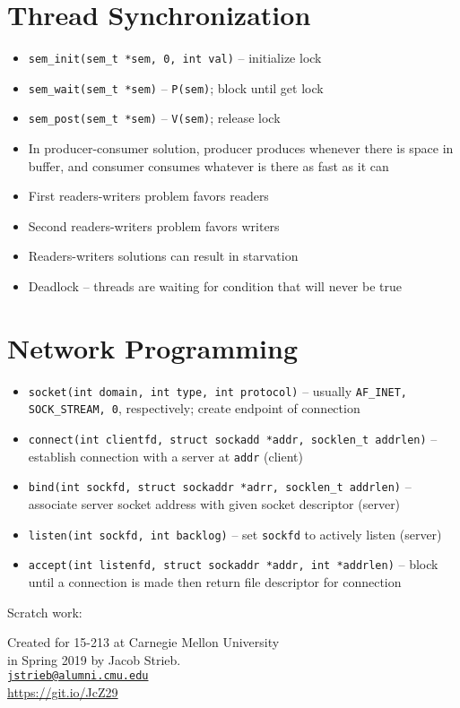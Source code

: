 \documentclass[twocolumn]{article}
\begin{document}
\section{Thread Synchronization}
\begin{itemize}[noitemsep]
    \item \texttt{sem\_init(sem\_t *sem, 0, int val)} -- initialize lock
    \item \texttt{sem\_wait(sem\_t *sem)} -- \texttt{P(sem)}; block until get lock
    \item \texttt{sem\_post(sem\_t *sem)} -- \texttt{V(sem)}; release lock
    \item In producer-consumer solution, producer produces whenever there is space in buffer, and consumer consumes whatever is there as fast as it can
    \item First readers-writers problem favors readers
    \item Second readers-writers problem favors writers
    \item Readers-writers solutions can result in starvation
    \item Deadlock -- threads are waiting for condition that will never be true
\end{itemize}

\section{Network Programming}
\begin{itemize}[noitemsep]
    \item \texttt{socket(int domain, int type, int protocol)} -- usually \texttt{AF\_INET, SOCK\_STREAM, 0}, respectively; create endpoint of connection
    \item \texttt{connect(int clientfd, struct sockadd *addr, socklen\_t addrlen)} -- establish connection with a server at \texttt{addr} (client)
    \item \texttt{bind(int sockfd, struct sockaddr *adrr, socklen\_t addrlen)} -- associate server socket address with given socket descriptor (server)
    \item \texttt{listen(int sockfd, int backlog)} -- set \texttt{sockfd} to actively listen (server)
    \item \texttt{accept(int listenfd, struct sockaddr *addr, int *addrlen)} -- block until a connection is made then return file descriptor for connection
\end{itemize}

\vfill

Scratch work:

\vfill

\begin{center}
  Created for 15-213 at Carnegie Mellon University \\
  in Spring 2019 by Jacob Strieb. \\
  \href{mailto:jstrieb@alumni.cmu.edu}{\texttt{jstrieb@alumni.cmu.edu}} \\
  \url{https://git.io/JcZ29}
\end{center}
\end{document}
